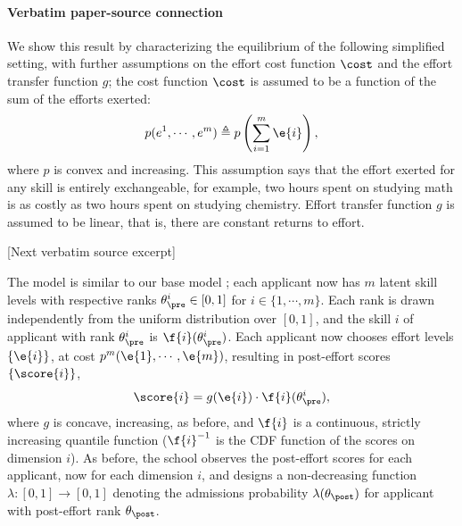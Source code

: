 \documentclass[10pt]{article}
\begin{document}
\paragraph{Verbatim paper-source connection}
\begin{ReviewVerbatim}
We show this result by characterizing the equilibrium of the following simplified setting, with further assumptions on the effort cost function $\cost$ and the effort transfer function $g$; the cost function $\cost$ is assumed to be a function of the sum of the efforts exerted:
\[p(e^1, \cdots, e^m) \triangleq p\left(\sum_{i=1}^m \e{i}\right),\] where $p$ is convex and increasing.
This assumption says that the effort exerted for any skill is entirely exchangeable, for example, two hours spent on studying math is as costly as two hours spent on studying chemistry.
%
Effort transfer function $g$ is assumed to be linear, that is, there are constant returns to effort.

[Next verbatim source excerpt]

 The model is similar to our base model ; each applicant now has $m$ latent skill levels with respective ranks $\theta_\pre^i \in [0,1]$ for $i\in \{1, \cdots, m\}$. Each rank is drawn independently from the uniform distribution over $[0,1]$, and the skill $i$ of applicant with rank $\theta_\pre^i$ is $\f{i}(\theta_\pre^i)$. Each applicant now chooses effort levels $\{ \e{i} \}$, at cost $p^m( \e{1}, \cdots, \e{m})$, resulting in post-effort scores $\{\score{i}\}$,
\begin{equation*}
\score{i} = g(\e{i})\cdot \f{i}(\theta_\pre^i),
\end{equation*}
where $g$ is concave, increasing, as before, and $\f{i}$ is a continuous, strictly increasing quantile function (${\f{i}}^{-1}$ is the CDF function of the scores on dimension $i$). As before, the school observes the post-effort scores for each applicant, now for each dimension $i$, and designs a non-decreasing function $\lambda : [0,1] \to [0,1]$ denoting the admissions probability $\lambda(\theta_\post)$ for applicant with post-effort rank $\theta_\post$.



\end{ReviewVerbatim}
\end{document}

